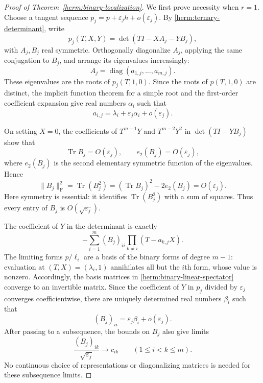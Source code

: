 \documentclass[reqno]{amsart}
\theoremstyle{definition}
\theoremstyle{remark}
\DeclareMathOperator{\Tr}{Tr}
\DeclareMathOperator{\diag}{diag}
\begin{document}
\begin{proof}[Proof of Theorem~\ref{herm:binary-localization}]
We first prove necessity when $r=1$.  Choose a tangent sequence
$p_j=p+\varepsilon_jh+o(\varepsilon_j)$.
By \eqref{herm:ternary-determinant}, write
\[
 p_j(T,X,Y)=\det(TI-XA_j-YB_j),
\]
with $A_j,B_j$ real symmetric.  Orthogonally diagonalize $A_j$, applying
the same conjugation to $B_j$, and arrange its eigenvalues increasingly:
\[
 A_j=\diag(a_{1,j},\ldots,a_{m,j}).
\]
These eigenvalues are the roots of $p_j(T,1,0)$.  Since the roots of
$p(T,1,0)$ are distinct, the implicit function theorem for a simple root
and the first-order coefficient expansion give real numbers $\alpha_i$
such that
\begin{equation}\label{herm:binary-eigenvalue-expansion}
 a_{i,j}=\lambda_i+\varepsilon_j\alpha_i+o(\varepsilon_j).
\end{equation}

On setting $X=0$, the coefficients of $T^{m-1}Y$ and $T^{m-2}Y^2$
in $\det(TI-YB_j)$ show that
\[
 \Tr B_j=O(\varepsilon_j),\qquad e_2(B_j)=O(\varepsilon_j),
\]
where $e_2(B_j)$ is the second elementary symmetric function of the
eigenvalues.  Hence
\[
 \|B_j\|_{\mathrm F}^2
 =\Tr(B_j^2)=(\Tr B_j)^2-2e_2(B_j)=O(\varepsilon_j).
\]
Here symmetry is essential: it identifies $\Tr(B_j^2)$ with a sum of
squares.  Thus every entry of $B_j$ is $O(\sqrt{\varepsilon_j})$.

The coefficient of $Y$ in the determinant is exactly
\begin{equation}\label{herm:binary-linear-spectator}
 -\sum_{i=1}^m(B_j)_{ii}
       \prod_{k\ne i}(T-a_{k,j}X).
\end{equation}
The limiting forms $p/\ell_i$ are a basis of the binary forms of
degree $m-1$: evaluation at $(T,X)=(\lambda_i,1)$ annihilates all
but the $i$th form, whose value is nonzero.  Accordingly, the basis
matrices in \eqref{herm:binary-linear-spectator} converge to an
invertible matrix.  Since the coefficient of $Y$ in $p_j$ divided by
$\varepsilon_j$ converges coefficientwise, there are uniquely determined
real numbers $\beta_i$ such that
\begin{equation}\label{herm:binary-diagonal-expansion}
 (B_j)_{ii}=\varepsilon_j\beta_i+o(\varepsilon_j).
\end{equation}
After passing to a subsequence, the bounds on $B_j$ also give limits
\[
 \frac{(B_j)_{ik}}{\sqrt{\varepsilon_j}}\longrightarrow c_{ik}
 \qquad(1\leq i<k\leq m).
\]
No continuous choice of representations or diagonalizing matrices is
needed for these subsequence limits.


\end{proof}
\end{document}
